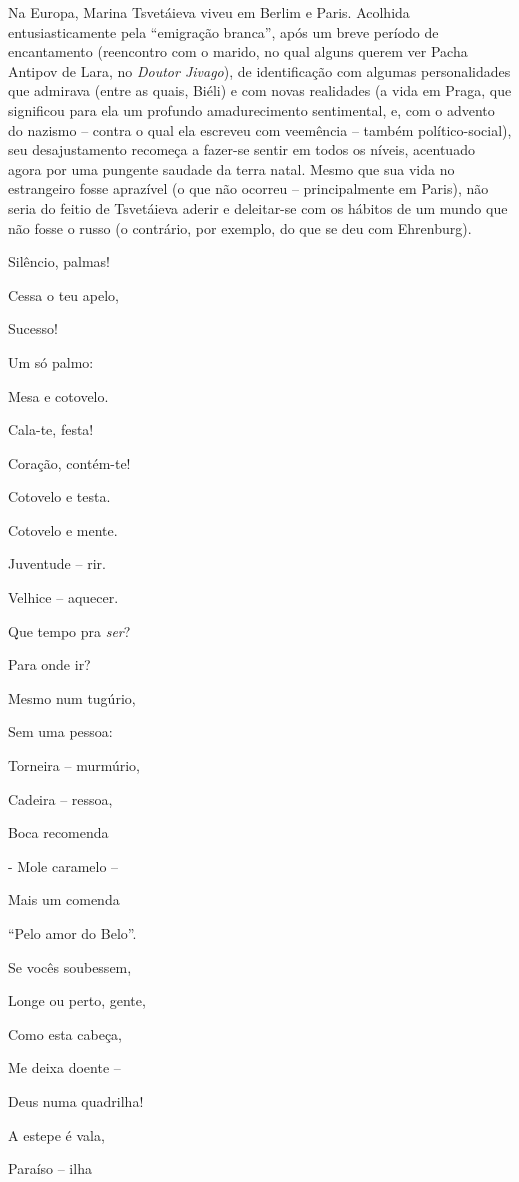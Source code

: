 Na Europa, Marina Tsvetáieva viveu em Berlim e Paris. Acolhida
entusiasticamente pela ``emigração branca'', após um breve período de
encantamento (reencontro com o marido, no qual alguns querem ver Pacha
Antipov de Lara, no \emph{Doutor Jivago}), de identificação com algumas
personalidades que admirava (entre as quais, Biéli) e com novas
realidades (a vida em Praga, que significou para ela um profundo
amadurecimento sentimental, e, com o advento do nazismo -- contra o qual
ela escreveu com veemência -- também político-social), seu
desajustamento recomeça a fazer-se sentir em todos os níveis, acentuado
agora por uma pungente saudade da terra natal. Mesmo que sua vida no
estrangeiro fosse aprazível (o que não ocorreu -- principalmente em
Paris), não seria do feitio de Tsvetáieva aderir e deleitar-se com os
hábitos de um mundo que não fosse o russo (o contrário, por exemplo, do
que se deu com Ehrenburg).

Silêncio, palmas!

Cessa o teu apelo,

Sucesso!

Um só palmo:

Mesa e cotovelo.

Cala-te, festa!

Coração, contém-te!

Cotovelo e testa.

Cotovelo e mente.

Juventude -- rir.

Velhice -- aquecer.

Que tempo pra \emph{ser}?

Para onde ir?

Mesmo num tugúrio,

Sem uma pessoa:

Torneira -- murmúrio,

Cadeira -- ressoa,

Boca recomenda

- Mole caramelo --

Mais um comenda

``Pelo amor do Belo''.

Se vocês soubessem,

Longe ou perto, gente,

Como esta cabeça,

Me deixa doente --

Deus numa quadrilha!

A estepe é vala,

Paraíso -- ilha

